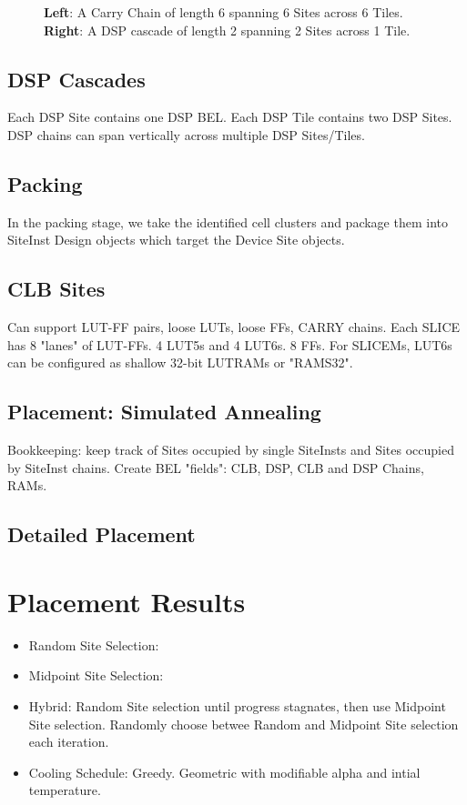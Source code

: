 \documentclass[twocolumn]{article}
\begin{document}
\begin{figure}
                \caption{\textbf{Left}: A Carry Chain of length 6 spanning 6 Sites across 6 Tiles. \textbf{Right}: A DSP cascade of length 2 spanning 2 Sites across 1 Tile.}
            \end{figure}

        \subsection{DSP Cascades}
            Each DSP Site contains one DSP BEL. 
            Each DSP Tile contains two DSP Sites. 
            DSP chains can span vertically across multiple DSP Sites/Tiles. 


    \subsection{Packing}
        In the packing stage, we take the identified cell clusters and package them into SiteInst Design objects which target the Device Site objects. 
        \subsection{CLB Sites}
            Can support LUT-FF pairs, loose LUTs, loose FFs, CARRY chains. 
            Each SLICE has 8 "lanes" of LUT-FFs. 4 LUT5s and 4 LUT6s. 8 FFs. 
            For SLICEMs, LUT6s can be configured as shallow 32-bit LUTRAMs or "RAMS32". 

    \subsection{Placement: Simulated Annealing} 
        Bookkeeping: keep track of Sites occupied by single SiteInsts and Sites occupied by SiteInst chains. 
        Create BEL "fields": CLB, DSP, CLB and DSP Chains, RAMs. 

        \subsection{Detailed Placement}


\section{Placement Results}
    \begin{itemize}
    \item Random Site Selection:
    \item Midpoint Site Selection:
    \item Hybrid: 
        Random Site selection until progress stagnates, then use Midpoint Site selection. 
        Randomly choose betwee Random and Midpoint Site selection each iteration. 
    \item Cooling Schedule: 
        Greedy. 
        Geometric with modifiable alpha and intial temperature. 
    \end{itemize}
\end{document}
